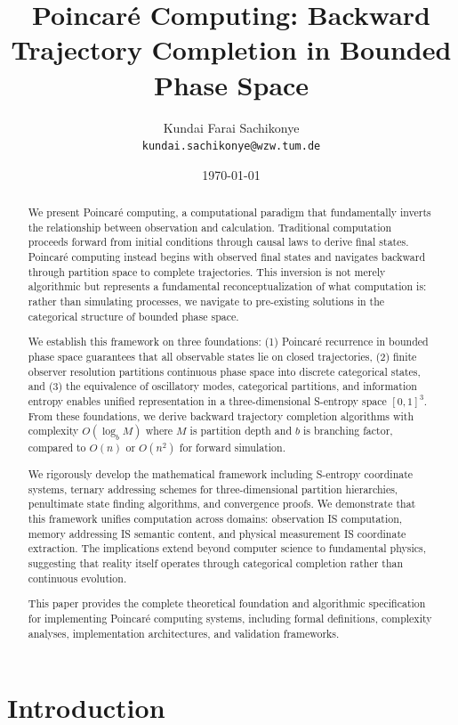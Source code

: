\documentclass[twocolumn,10pt]{article}
\title{\textbf{Poincaré Computing: Backward Trajectory Completion in Bounded Phase Space}}
\author{
    Kundai Farai Sachikonye\\
    \texttt{kundai.sachikonye@wzw.tum.de}
}
\date{\today}
\begin{document}
\maketitle

\begin{abstract}
We present Poincaré computing, a computational paradigm that fundamentally inverts the relationship between observation and calculation. Traditional computation proceeds forward from initial conditions through causal laws to derive final states. Poincaré computing instead begins with observed final states and navigates backward through partition space to complete trajectories. This inversion is not merely algorithmic but represents a fundamental reconceptualization of what computation is: rather than simulating processes, we navigate to pre-existing solutions in the categorical structure of bounded phase space.

We establish this framework on three foundations: (1) Poincaré recurrence in bounded phase space guarantees that all observable states lie on closed trajectories, (2) finite observer resolution partitions continuous phase space into discrete categorical states, and (3) the equivalence of oscillatory modes, categorical partitions, and information entropy enables unified representation in a three-dimensional S-entropy space $[0,1]^3$. From these foundations, we derive backward trajectory completion algorithms with complexity $O(\log_b M)$ where $M$ is partition depth and $b$ is branching factor, compared to $O(n)$ or $O(n^2)$ for forward simulation.

We rigorously develop the mathematical framework including S-entropy coordinate systems, ternary addressing schemes for three-dimensional partition hierarchies, penultimate state finding algorithms, and convergence proofs. We demonstrate that this framework unifies computation across domains: observation IS computation, memory addressing IS semantic content, and physical measurement IS coordinate extraction. The implications extend beyond computer science to fundamental physics, suggesting that reality itself operates through categorical completion rather than continuous evolution.

This paper provides the complete theoretical foundation and algorithmic specification for implementing Poincaré computing systems, including formal definitions, complexity analyses, implementation architectures, and validation frameworks.
\end{abstract}

\section{Introduction}
\end{document}
